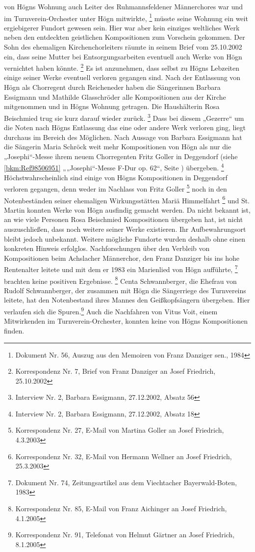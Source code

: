 von Högns Wohnung auch Leiter des Ruhmannsfeldener Männerchores war und
im Turnverein-Orchester unter Högn mitwirkte, \footnote{Dokument Nr.
56, Auszug aus den Memoiren von Franz Danziger sen., 1984} müsste seine
Wohnung ein weit ergiebigerer Fundort gewesen sein. Hier war aber kein
einziges weltliches Werk neben den entdeckten geistlichen Kompositionen
zum Vorschein gekommen. Der Sohn des ehemaligen Kirchenchorleiters
räumte in seinem Brief vom 25.10.2002 ein, dass seine Mutter bei
Entsorgungsarbeiten eventuell auch Werke von Högn vernichtet haben
könnte. \footnote{Korrespondenz Nr. 7, Brief von Franz Danziger an
Josef Friedrich, 25.10.2002} Es ist anzunehmen, dass selbst zu Högns
Lebzeiten einige seiner Werke eventuell verloren gegangen sind. Nach
der Entlassung von Högn als Chorregent durch Reicheneder haben die
Sängerinnen Barbara Essigmann und Mathilde Glasschröder alle
Kompositionen aus der Kirche mitgenommen und in Högns Wohnung getragen.
Die Haushälterin Rosa Beischmied trug sie kurz darauf wieder
zurück. \footnote{Interview Nr. 2, Barbara Essigmann, 27.12.2002,
Absatz 56} Dass bei diesem „Gezerre“ um die Noten nach Högns Entlassung
das eine oder andere Werk verloren ging, liegt durchaus im Bereich des
Möglichen. Nach Aussage von Barbara Essigmann hat die Sängerin Maria
Schröck weit mehr Kompositionen von Högn als nur die „Josephi“-Messe
ihrem neuem Chorregenten Fritz Goller in Deggendorf (siehe
\ref{bkm:Ref98506951} „„Josephi“-Messe F-Dur op. 62“, Seite
\pageref{bkm:Ref98506963}) übergeben. \footnote{Interview Nr. 2,
Barbara Essigmann, 27.12.2002, Absatz 18} Höchstwahrscheinlich sind
einige von Högns Kompositionen in Deggendorf verloren gegangen, denn
weder im Nachlass von Fritz Goller \footnote{Korrespondenz Nr. 27,
E-Mail von Martina Goller an Josef Friedrich, 4.3.2003} noch in den
Notenbeständen seiner ehemaligen Wirkungsstätten Mariä
Himmelfahrt \footnote{Korrespondenz Nr. 32, E-Mail von Hermann Wellner
an Josef Friedrich, 25.3.2003} und St. Martin konnten Werke von Högn
ausfindig gemacht werden. Da nicht bekannt ist, an wie viele Personen
Rosa Beischmied Kompositionen übergeben hat, ist nicht auszuschließen,
dass noch weitere seiner Werke existieren. Ihr Aufbewahrungsort bleibt
jedoch unbekannt. Weitere mögliche Fundorte wurden deshalb ohne einen
konkreten Hinweis erfolglos. Nachforschungen über den Verbleib von
Kompositionen beim Achslacher Männerchor, den Franz Danziger bis ins
hohe Rentenalter leitete und mit dem er 1983 ein Marienlied von Högn
aufführte, \footnote{Dokument Nr. 74, Zeitungsartikel aus dem
Viechtacher Bayerwald-Boten, 1983} brachten keine positiven
Ergebnisse. \footnote{Korrespondenz Nr. 85, E-Mail von Franz Aichinger
an Josef Friedrich, 4.1.2005} Centa Schwannberger, die Ehefrau von
Rudolf Schwannberger, der zusammen mit Högn die Sängerriege des
Turnvereins leitete, hat den Notenbestand ihres Mannes den
Geißkopfsängern übergeben. Hier verlaufen sich die Spuren.\footnote{
Korrespondenz Nr. 91, Telefonat von Helmut Gärtner an Josef Friedrich,
8.1.2005} Auch die Nachfahren von Vitus Voit, einem Mitwirkenden im
Turnverein-Orchester, konnten keine von Högns Kompositionen finden.

